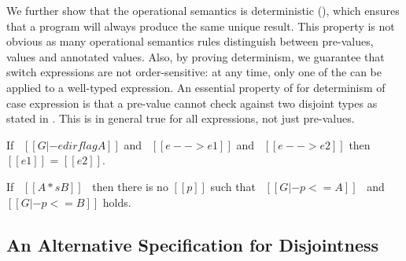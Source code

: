 We further show that the operational semantics is deterministic
(), which ensures
that a program will always produce the same unique result. This property is not
obvious as many operational semantics rules distinguish between pre-values,
values and annotated values. Also, by proving determinism, we guarantee that
switch expressions are not order-sensitive: at any time, only one of the
 can be applied to a well-typed expression.
An essential property of \cal for determinism of case expression is
that a pre-value cannot check against two disjoint types as stated in
. This is in general true for
all expressions, not just pre-values.

\begin{theorem}[Determinism]
\label{lemma:union:determinism}
  If \ $[[G |- e dirflag A]]$ and \ $[[e --> e1]]$ and \ $[[e --> e2]]$ then $[[e1]]$ = $[[e2]]$.
\end{theorem}

\begin{comment}
\begin{proof}
  By induction on first reduction relation and inverting second reduction relation subsequently.
  All cases are trivial to solve by simple inversions except:
  \begin{itemize}
    \item Case \rref{typ-typeof} requires \cref{lemma:union:check-both-disj-false}.
  \end{itemize}
\end{proof}
\end{comment}

\begin{lemma}
\label{lemma:union:check-both-disj-false}
If \ $[[A *s B]]$ \ then there is no $[[p]]$ such that
\ $[[G |- p <= A]]$ \ and \ $[[G |- p <= B]]$ holds.
\end{lemma}



\subsection{An Alternative Specification for Disjointness}
\label{sec:union:discussion}
\begin{comment}
\snow{I feel the reason and consequence are flipped here.
The alternative spec definitely equals to the previous one
because we define ``ordinary types" to satisfy:
1) no bottom-like types are ordinary;
2) any type must have an ordinary subtype if it is not bottom-like.
Or we need to provide some intuition for ordinary types themselves.}
\end{comment}

